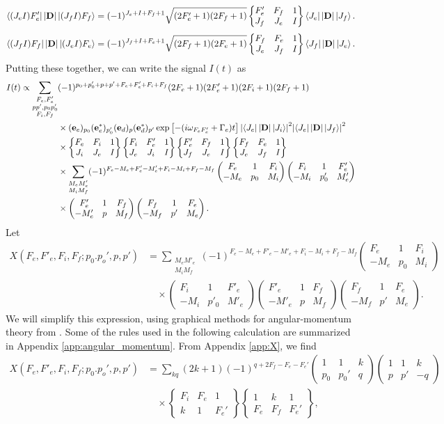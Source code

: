 \documentclass[11pt]{article}
\newcommand{\F}{\mathcal{F}}
\newcommand{\lb}{\left[}
\newcommand{\rb}{\right]}
\newcommand{\tj}[6]{ \begin{pmatrix}
		#1 & #2 & #3 \\
		#4 & #5 & #6 
\end{pmatrix}}
\newcommand{\Gj}[6]{ \begin{Bmatrix}
		#1 & #2 & #3 \\
		#4 & #5 & #6 
\end{Bmatrix}}
\begin{document}
\begin{align*}
\bra{(J_e I)F_e'}\abs{\mathbf{D}} \ket{(J_f I)F_f}
= (-1)^{J_e + I + F_f + 1}\sqrt{(2F'_e + 1)(2F_f+1)} 
\Gj{F'_e}{F_f}{1}{J_f}{J_e}{I}\bra{J_e}\abs{\mathbf{D}} \ket{J_f}.
\end{align*}
\begin{align*}
\bra{(J_f I)F_f} \abs{\mathbf{D}} \ket{(J_e I)F_e}
= (-1)^{J_f + I + F_e + 1}\sqrt{(2F_f + 1)(2F_e+1)} 
\Gj{F_f}{F_e}{1}{J_e}{J_f}{I}\bra{J_f}\abs{\mathbf{D}} \ket{J_e}.
\end{align*}
Putting these together, we can write the signal $I(t)$ as
\begin{align}\label{eq:I(t)}
I(t) 
\propto 
\sum_{\substack{F_e, F'_e\\pp', p_0p'_0\\F_i, F_f}}
&(-1)^{p_0 + p'_0 + p + p' + F_e + F_e' + F_i + F_f}
(2F_e + 1)(2F'_e+1)(2F_i + 1)(2F_f+1)\\
& \times (\mathbf{e}_e)_{p_0}(\mathbf{e}^*_e)_{p_0'}(\mathbf{e}_d)_{p}(\mathbf{e}_d^*)_{p'} \exp\lb -(i\omega_{F_eF'_e} + \Gamma_e)t \rb\abs{\bra{J_e} \abs{\mathbf{D}}\ket{J_i}}^2\abs{ \bra{J_e} \abs{\mathbf{D}} \ket{J_f}}^2\\
&\times \Gj{F_e}{F_i}{1}{J_i}{J_e}{I}\Gj{F_i}{F'_e}{1}{J_e}{J_i}{I}\Gj{F'_e}{F_f}{1}{J_f}{J_e}{I}\Gj{F_f}{F_e}{1}{J_e}{J_f}{I}\\
&\times \sum_{\substack{M_eM'_e\\ M_i M_f}}(-1)^{F_e - M_e + F'_e - M'_e + F_i - M_i + F_f - M_f} \tj{F_e}{1}{F_i}{-M_e}{p_0}{M_i}\tj{F_i}{1}{F'_e}{-M_i}{p'_0}{M'_e}\\
&\times \tj{F'_e}{1}{F_f}{-M'_e}{p}{M_f}\tj{F_f}{1}{F_e}{-M_f}{p'}{M_e}.
\end{align}
Let 
\begin{align*}
X(F_e,F'_e,F_i,F_f;p_0.p_o',p,p') &= \sum_{\substack{M_eM'_e\\ M_i M_f}}(-1)^{F_e - M_e + F'_e - M'_e + F_i - M_i + F_f - M_f} \tj{F_e}{1}{F_i}{-M_e}{p_0}{M_i}\\ 
&\quad \times 
\tj{F_i}{1}{F'_e}{-M_i}{p'_0}{M'_e}
\tj{F'_e}{1}{F_f}{-M'_e}{p}{M_f}
\tj{F_f}{1}{F_e}{-M_f}{p'}{M_e}.
\end{align*}
We will simplify this expression, using graphical methods for angular-momentum theory from \cite{angular_momentum}. Some of the rules used in the following calculation are summarized in Appendix \ref{app:angular_momentum}. From Appendix \ref{app:X}, we find 
\begin{align*}
X(F_e,F'_e,F_i,F_f;p_0.p_o',p,p') 
&= \sum_{kq} (2k+1) 
(-1)^{q + 2F_f - F_e -F_e'}
\tj{1}{1}{k}{p_0}{p_0'}{q}\tj{1}{1}{k}{p}{p'}{-q}  \\
&\quad\times \Gj{F_i}{F_e}{1}{k}{1}{F_e'} \Gj{1}{k}{1}{F_e}{F_f}{F_e'},
\end{align*}
\end{document}
